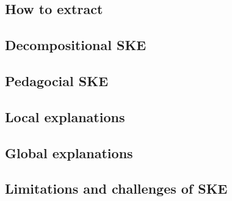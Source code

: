 \subsection{How to extract}\label{subsec:how-to-extract}

\subsection[Decompositional SKE]{Decompositional \Gls{SKE}}\label{subsec:decompositional-ske}

\subsection[Pedagocial SKE]{Pedagocial \Gls{SKE}}\label{subsec:pedagogical-ske}

\subsection{Local explanations}\label{subsec:local-explanations}

\subsection{Global explanations}\label{subsec:global-explanations}

\subsection[Limitations and challenges of SKE]{Limitations and challenges of \Gls{SKE}}\label{subsec:limitations-and-challenges-of-ske}